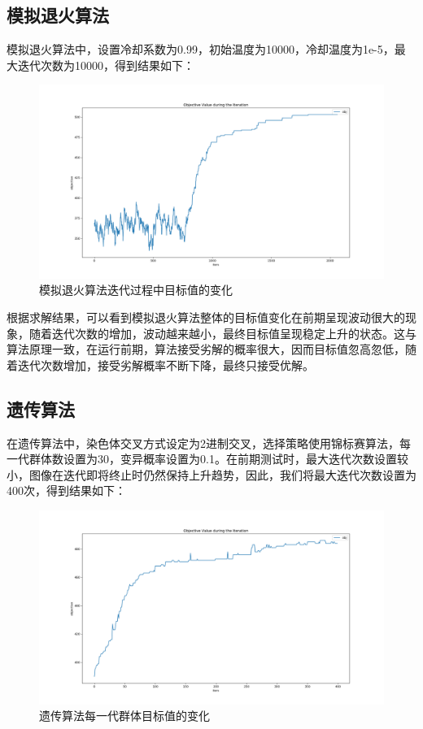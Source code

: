 \documentclass{article}
\begin{document}
    \subsection{模拟退火算法}
    模拟退火算法中，设置冷却系数为0.99，初始温度为10000，冷却温度为1e-5，最大迭代次数为10000，得到结果如下：
    \begin{figure}[H]
        \centering
        \includegraphics[width=\textwidth]{./image/sa.png}
        \caption{模拟退火算法迭代过程中目标值的变化}
    \end{figure}

    根据求解结果，可以看到模拟退火算法整体的目标值变化在前期呈现波动很大的现象，随着迭代次数的增加，波动越来越小，最终目标值呈现稳定上升的状态。这与算法原理一致，在运行前期，算法接受劣解的概率很大，因而目标值忽高忽低，随着迭代次数增加，接受劣解概率不断下降，最终只接受优解。

    \subsection{遗传算法}
    在遗传算法中，染色体交叉方式设定为2进制交叉，选择策略使用锦标赛算法，每一代群体数设置为30，变异概率设置为0.1。在前期测试时，最大迭代次数设置较小，图像在迭代即将终止时仍然保持上升趋势，因此，我们将最大迭代次数设置为400次，得到结果如下：
    \begin{figure}[H]
        \centering
        \includegraphics[width=\textwidth]{./image/ga.png}
        \caption{遗传算法每一代群体目标值的变化}
    \end{figure}
\end{document}
